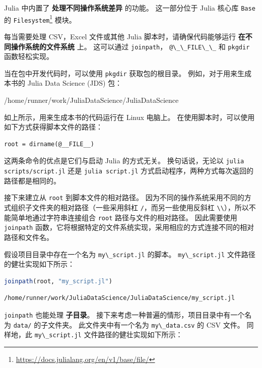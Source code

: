 \documentclass[
  notoc %
]{tufte-book}
\DeclareRobustCommand{\href}[2]{#2\footnote{\url{#1}}}
\newcommand{\passthrough}[1]{#1}
\begin{document}
Julia 中内置了 \textbf{处理不同操作系统差异} 的功能。 这一部分位于 Julia
核心库 \passthrough{\lstinline!Base!} 的
\href{https://docs.julialang.org/en/v1/base/file/}{\passthrough{\lstinline!Filesystem!}}
模块。

每当需要处理 CSV，Excel 文件或其他 Julia 脚本时，请确保代码能够运行
\textbf{在不同操作系统的文件系统} 上。 这可以通过
\passthrough{\lstinline!joinpath!}，
\passthrough{\lstinline!@\_\_FILE\_\_!} 和
\passthrough{\lstinline!pkgdir!} 函数轻松实现。

当在包中开发代码时，可以使用 \passthrough{\lstinline!pkgdir!}
获取包的根目录。 例如，对于用来生成本书的 Julia Data Science (JDS) 包：

/home/runner/work/JuliaDataScience/JuliaDataScience

如上所示，用来生成本书的代码运行在 Linux 电脑上。
在使用脚本时，可以使用如下方式获得脚本文件的路径：

\begin{lstlisting}
root = dirname(@__FILE__)
\end{lstlisting}

这两条命令的优点是它们与启动 Julia 的方式无关。 换句话说，无论以
\passthrough{\lstinline!julia scripts/script.jl!} 还是
\passthrough{\lstinline!julia script.jl!}
方式启动程序，两种方式每次返回的路径都是相同的。

接下来建立从 \passthrough{\lstinline!root!} 到脚本文件的相对路径。
因为不同的操作系统采用不同的方式组织子文件夹的相对路径（一些采用斜杠
\passthrough{\lstinline!/!}，而另一些使用反斜杠
\passthrough{\lstinline!\\!}），所以不能简单地通过字符串连接组合
\passthrough{\lstinline!root!} 路径与文件的相对路径。 因此需要使用
\passthrough{\lstinline!joinpath!}
函数，它将根据特定的文件系统实现，采用相应的方式连接不同的相对路径和文件名。

假设项目目录中存在一个名为 \passthrough{\lstinline!my\_script.jl!}
的脚本。 \passthrough{\lstinline!my\_script.jl!}
文件路径的健壮实现如下所示：

\begin{lstlisting}[language=Julia]
joinpath(root, "my_script.jl")
\end{lstlisting}

\begin{lstlisting}[language=Output]
/home/runner/work/JuliaDataScience/JuliaDataScience/my_script.jl
\end{lstlisting}

\passthrough{\lstinline!joinpath!} 也能处理 \textbf{子目录}。
接下来考虑一种普遍的情形，项目目录中有一个名为
\passthrough{\lstinline!data/!} 的子文件夹。 此文件夹中有一个名为
\passthrough{\lstinline!my\_data.csv!} 的 CSV 文件。 同样地，此
\passthrough{\lstinline!my\_script.jl!} 文件路径的健壮实现如下所示：
\end{document}
